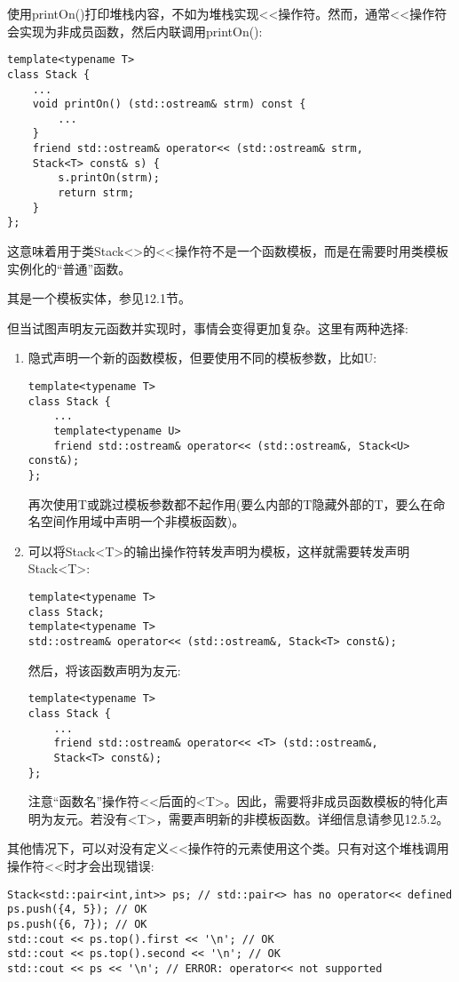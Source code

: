 
使用printOn()打印堆栈内容，不如为堆栈实现<{}<操作符。然而，通常<{}<操作符会实现为非成员函数，然后内联调用printOn():

\begin{lstlisting}[style=styleCXX]
template<typename T>
class Stack {
	...
	void printOn() (std::ostream& strm) const {
		...
	}
	friend std::ostream& operator<< (std::ostream& strm,
	Stack<T> const& s) {
		s.printOn(strm);
		return strm;
	}
};
\end{lstlisting}

这意味着用于类Stack<>的<{}<操作符不是一个函数模板，而是在需要时用类模板实例化的“普通”函数。

\begin{tcolorbox}[colback=webgreen!5!white,colframe=webgreen!75!black]
\hspace*{0.75cm}其是一个模板实体，参见12.1节。
\end{tcolorbox}

但当试图声明友元函数并实现时，事情会变得更加复杂。这里有两种选择:

\begin{enumerate}
\item 
隐式声明一个新的函数模板，但要使用不同的模板参数，比如U:

\begin{lstlisting}[style=styleCXX]
template<typename T>
class Stack {
	...
	template<typename U>
	friend std::ostream& operator<< (std::ostream&, Stack<U> const&);
};
\end{lstlisting}

再次使用T或跳过模板参数都不起作用(要么内部的T隐藏外部的T，要么在命名空间作用域中声明一个非模板函数)。

\item 
可以将Stack<T>的输出操作符转发声明为模板，这样就需要转发声明Stack<T>:

\begin{lstlisting}[style=styleCXX]
template<typename T>
class Stack;
template<typename T>
std::ostream& operator<< (std::ostream&, Stack<T> const&);
\end{lstlisting}

然后，将该函数声明为友元:

\begin{lstlisting}[style=styleCXX]
template<typename T>
class Stack {
	...
	friend std::ostream& operator<< <T> (std::ostream&,
	Stack<T> const&);
};
\end{lstlisting}

注意“函数名”操作符<{}<后面的<T>。因此，需要将非成员函数模板的特化声明为友元。若没有<T>，需要声明新的非模板函数。详细信息请参见12.5.2。
\end{enumerate}

其他情况下，可以对没有定义<{}<操作符的元素使用这个类。只有对这个堆栈调用操作符<{}<时才会出现错误:

\begin{lstlisting}[style=styleCXX]
Stack<std::pair<int,int>> ps; // std::pair<> has no operator<< defined
ps.push({4, 5}); // OK
ps.push({6, 7}); // OK
std::cout << ps.top().first << '\n'; // OK
std::cout << ps.top().second << '\n'; // OK
std::cout << ps << '\n'; // ERROR: operator<< not supported
\end{lstlisting}




